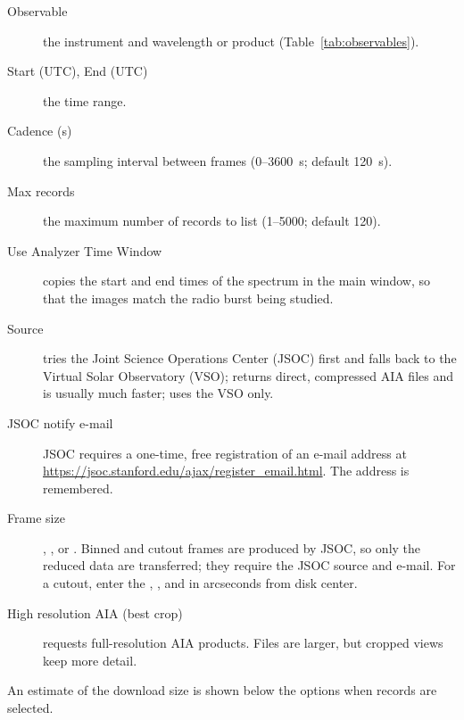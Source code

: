 
\begin{description}
  \item[Observable] the instrument and wavelength or product (Table~\ref{tab:observables}).
  \item[Start (UTC), End (UTC)] the time range.
  \item[Cadence (s)] the sampling interval between frames (0--3600~s; default 120~s).
  \item[Max records] the maximum number of records to list (1--5000; default 120).
  \item[Use Analyzer Time Window] copies the start and end times of the spectrum in the main
    window, so that the images match the radio burst being studied.
\end{description}

\begin{description}
  \item[Source]  tries the Joint Science Operations Center (JSOC)
    first and falls back to the Virtual Solar Observatory (VSO);  returns
    direct, compressed AIA files and is usually much faster;  uses the
    VSO only.
  \item[JSOC notify e-mail] JSOC requires a one-time, free registration of an e-mail address
    at \url{https://jsoc.stanford.edu/ajax/register_email.html}. The address is remembered.
  \item[Frame size] , , 
    or . Binned and cutout frames are produced by JSOC, so only the
    reduced data are transferred; they require the JSOC source and e-mail. For a cutout,
    enter the , ,  and  in arcseconds
    from disk center.
  \item[High resolution AIA (best crop)] requests full-resolution AIA products. Files are
    larger, but cropped views keep more detail.
\end{description}
An estimate of the download size is shown below the options when records are selected.


